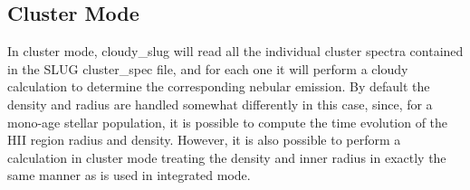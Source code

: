 \documentclass[letterpaper,10pt,english]{sphinxmanual}
\begin{document}
\subsection{Cluster Mode}
\label{cloudy:cluster-mode}\label{cloudy:sssec-cloudy-cluster-mode}
In cluster mode, cloudy\_slug will read all the individual cluster
spectra contained in the SLUG cluster\_spec file, and for each one it
will perform a cloudy calculation to determine the corresponding
nebular emission. By default the density and radius are handled somewhat
differently in this case, since, for a mono-age stellar population, it
is possible to compute the time evolution of the HII region radius and
density. However, it is also possible to perform a calculation in
cluster mode treating the density and inner radius in exactly the same
manner as is used in integrated mode.
\end{document}
